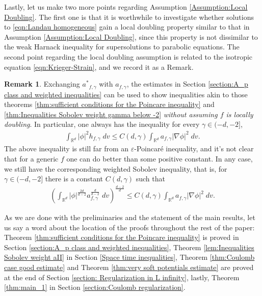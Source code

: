 \documentclass[12pt,american]{amsart}
\numberwithin{equation}{section}
\theoremstyle{plain}
\theoremstyle{definition}                  %
\newtheorem{rem}[thm]{Remark}
\def\astar{{a^*}}
\begin{document}
  Lastly, let us make two more points regarding Assumption \ref{Assumption:Local Doubling}. The first one is that it is worthwhile to investigate whether solutions to \eqref{eqn:Landau homogeneous} gain a local doubling property similar to that in Assumption \ref{Assumption:Local Doubling}, since this property is not dissimilar to the weak Harnack inequality for supersolutions to parabolic equations. The second point regarding the local doubling assumption is related to the isotropic equation \eqref{eqn:Krieger-Strain}, and we record it as a Remark.
\begin{rem}
  Exchanging $\astar_{f,\gamma}$ with $a_{f,\gamma}$, the estimates in Section \ref{section:A_p class and weighted inequalities} can be used to show inequalities akin to those theorems \ref{thm:sufficient conditions for the Poincare inequality} and \ref{thm:Inequalities Sobolev weight gamma below -2} \emph{without assuming $f$ is locally doubling}. In particular, one always has the inequality for every $\gamma \in (-d,-2]$,
  \begin{align*}
    \int_{\mathbb{R}^d}|\phi|^2h_{f,\gamma}\;dv \leq C(d,\gamma)\int_{\mathbb{R}^d}a_{f,\gamma}|\nabla \phi|^2\;dv.
  \end{align*}
 The above inequality is still far from an $\varepsilon$-Poincar\'e inequality, and it's not clear that for a generic $f$ one can do better than some positive constant. In any case, we still have the corresponding weighted Sobolev inequality, that is, for $\gamma\in(-d,-2]$ there is a constant $C(d,\gamma)$ such that
  \begin{align*}
    \left ( \int_{\mathbb{R}^d} |\phi|^{\frac{2d}{d-2}} a_{f,\gamma}^{\frac{d}{d-2}}\;dv\right )^{\frac{d-2}{d}} \leq C(d,\gamma) \int_{\mathbb{R}^d}a_{f,\gamma}|\nabla \phi|^2\;dv.
  \end{align*}
\end{rem}

As we are done with the preliminaries and the statement of the main results, let us say a word about the location of the proofs throughout the rest of the paper: Theorem \ref{thm:sufficient conditions for the Poincare inequality} is proved in Section \ref{section:A_p class and weighted inequalities},  Theorem \ref{lem:Inequalities Sobolev weight aII} in Section \ref{Space time inequalities}, Theorem \ref{thm:Coulomb case good estimate} and  Theorem \ref{thm:very soft potentials estimate}  are proved at the end of  Section \ref{section: Regularization in L infinity}, lastly, Theorem \ref{thm:main_1} in Section \ref{section:Coulomb regularization}.
\end{document}
